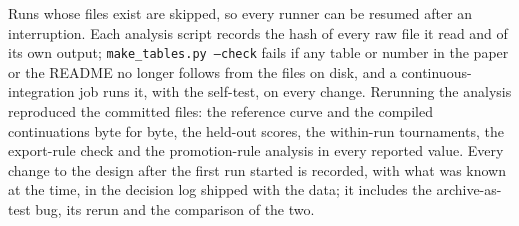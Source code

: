 \documentclass[11pt]{article}
\begin{document}
\noindent Runs whose files exist are skipped, so every runner can be resumed
after an interruption. Each analysis script records the hash of every raw file
it read and of its own output; \texttt{make\_tables.py --check} fails if any
table or number in the paper or the README no longer follows from the files
on disk, and a continuous-integration job runs it, with the self-test, on every
change. Rerunning the analysis reproduced the committed files: the reference
curve and the compiled continuations byte for byte, the held-out scores, the
within-run tournaments, the export-rule check and the promotion-rule analysis
in every reported value. Every change to the design after the first run
started is recorded, with what was known at the time, in the decision log
shipped with the data; it includes the archive-as-test bug, its rerun and the
comparison of the two.

\FloatBarrier
\end{document}

